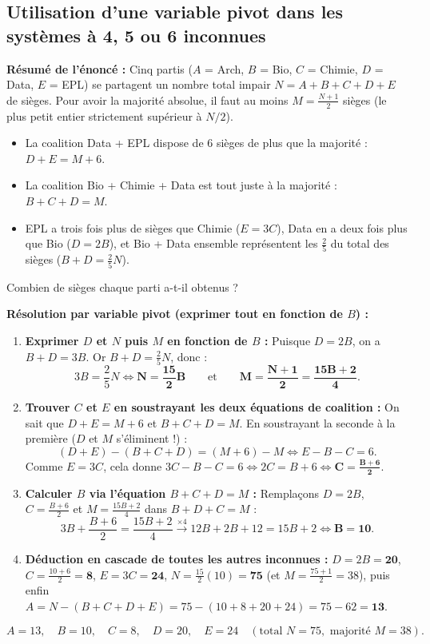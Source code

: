 \subsection{Utilisation d'une variable pivot dans les systèmes à 4, 5 ou 6 inconnues}

\begin{exemple}
\textbf{Résumé de l'énoncé :} Cinq partis ($A$ = Arch, $B$ = Bio, $C$ = Chimie, $D$ = Data, $E$ = EPL) se partagent un nombre total impair $N = A + B + C + D + E$ de sièges. Pour avoir la majorité absolue, il faut au moins $M = \frac{N + 1}{2}$ sièges (le plus petit entier strictement supérieur à $N/2$).
\begin{itemize}
    \item La coalition Data + EPL dispose de $6$ sièges de plus que la majorité : $D + E = M + 6$.
    \item La coalition Bio + Chimie + Data est tout juste à la majorité : $B + C + D = M$.
    \item EPL a trois fois plus de sièges que Chimie ($E = 3C$), Data en a deux fois plus que Bio ($D = 2B$), et Bio + Data ensemble représentent les $\frac{2}{5}$ du total des sièges ($B + D = \frac{2}{5}N$).
\end{itemize}
Combien de sièges chaque parti a-t-il obtenus ?

\textbf{Résolution par variable pivot (exprimer tout en fonction de $B$) :}
\begin{enumerate}
    \item \textbf{Exprimer $D$ et $N$ puis $M$ en fonction de $B$ :}
    Puisque $D = 2B$, on a $B + D = 3B$. Or $B + D = \frac{2}{5}N$, donc :
    \[
        3B = \frac{2}{5}N \iff \mathbf{N = \frac{15}{2}B} \qquad \text{et} \qquad \mathbf{M = \frac{N + 1}{2} = \frac{15B + 2}{4}}.
    \]
    \item \textbf{Trouver $C$ et $E$ en soustrayant les deux équations de coalition :}
    On sait que $D + E = M + 6$ et $B + C + D = M$. En soustrayant la seconde à la première ($D$ et $M$ s'éliminent !) :
    \[
        (D + E) - (B + C + D) = (M + 6) - M \iff E - B - C = 6.
    \]
    Comme $E = 3C$, cela donne $3C - B - C = 6 \iff 2C = B + 6 \iff \mathbf{C = \frac{B + 6}{2}}$.
    \item \textbf{Calculer $B$ via l'équation $B + C + D = M$ :}
    Remplaçons $D = 2B$, $C = \frac{B+6}{2}$ et $M = \frac{15B+2}{4}$ dans $B + D + C = M$ :
    \[
        3B + \frac{B + 6}{2} = \frac{15B + 2}{4} \xrightarrow{\times 4} 12B + 2B + 12 = 15B + 2 \iff \mathbf{B = 10}.
    \]
    \item \textbf{Déduction en cascade de toutes les autres inconnues :}
    $D = 2B = \mathbf{20}$, $C = \frac{10 + 6}{2} = \mathbf{8}$, $E = 3C = \mathbf{24}$, $N = \frac{15}{2}(10) = \mathbf{75}$ (et $M = \frac{75+1}{2} = 38$), puis enfin $A = N - (B + C + D + E) = 75 - (10 + 8 + 20 + 24) = 75 - 62 = \mathbf{13}$.
\end{enumerate}
\[
    \boxed{A = 13,\quad B = 10,\quad C = 8,\quad D = 20,\quad E = 24 \quad (\text{total } N = 75,\text{ majorité } M = 38)}.
\]
\end{exemple}

